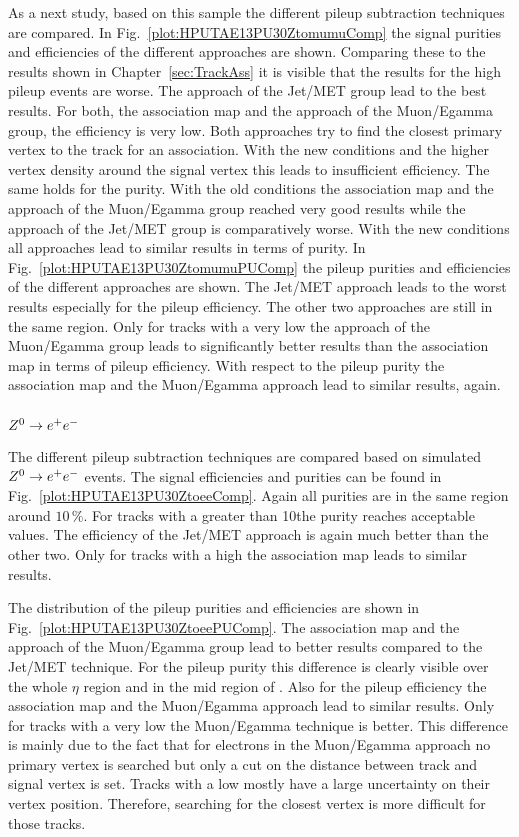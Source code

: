 As a next study, based on this sample the different pileup subtraction techniques are compared. In Fig.~\ref{plot:HPUTAE13PU30ZtomumuComp} the signal purities and efficiencies of the different approaches are shown. Comparing these to the results shown in Chapter~\ref{sec:TrackAss} it is visible that the results for the high pileup events are worse. The approach of the Jet/MET group lead to the best results. For both, the association map and the approach of the Muon/Egamma group, the efficiency is very low. Both approaches try to find the closest primary vertex to the track for an association. With the new conditions and the higher vertex density around the signal vertex this leads to insufficient efficiency. The same holds for the purity. With the old conditions the association map and the approach of the Muon/Egamma group reached very good results while the approach of the Jet/MET group is comparatively worse. With the new conditions all approaches lead to similar results in terms of purity.
In Fig.~\ref{plot:HPUTAE13PU30ZtomumuPUComp} the pileup purities and efficiencies of the different approaches are shown. The Jet/MET approach leads to the worst results especially for the pileup efficiency. The other two approaches are still in the same region. Only for tracks with a very low \pt the approach of the Muon/Egamma group leads to significantly better results than the association map in terms of pileup efficiency. With respect to the pileup purity the association map and the Muon/Egamma approach lead to similar results, again.

\subsubsection{${Z^{0}}\rightarrow e^+e^-$ \label{sec:HPUTAE13PU30Ztoee}}

The different pileup subtraction techniques are compared based on simulated ${Z^{0}}\rightarrow e^+e^-$ events. The signal efficiencies and purities can be found in Fig.~\ref{plot:HPUTAE13PU30ZtoeeComp}. Again all purities are in the same region around $10\,\%$. For tracks with a \pt greater than 10\GeV the purity reaches acceptable values. The efficiency of the Jet/MET approach is again much better than the other two. Only for tracks with a high \pt the association map leads to similar results.

The distribution of the pileup purities and efficiencies are shown in Fig.~\ref{plot:HPUTAE13PU30ZtoeePUComp}. The association map and the approach of the Muon/Egamma group lead to better results compared to the Jet/MET technique. For the pileup purity this difference is clearly visible over the whole $\eta$ region and in the mid region of \pt{}. Also for the pileup efficiency the association map and the Muon/Egamma approach lead to similar results. Only for tracks with a very low \pt the Muon/Egamma technique is better. This difference is mainly due to the fact that for electrons in the Muon/Egamma approach no primary vertex is searched but only a cut on the distance between track and signal vertex is set. Tracks with a low \pt mostly have a large uncertainty on their vertex position. Therefore, searching for the closest vertex is more difficult for those tracks.

